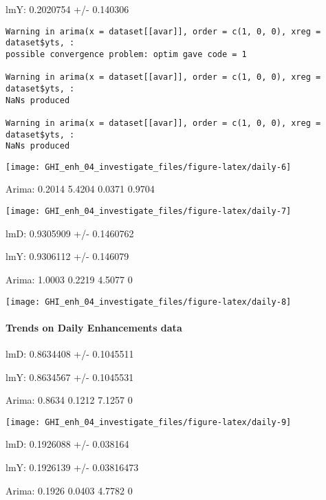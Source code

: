\documentclass[
  10pt,
  a4paper,oneside]{article}
\begin{document}
lmY: 0.2020754 +/- 0.140306

\begin{verbatim}
Warning in arima(x = dataset[[avar]], order = c(1, 0, 0), xreg = dataset$yts, :
possible convergence problem: optim gave code = 1

Warning in arima(x = dataset[[avar]], order = c(1, 0, 0), xreg = dataset$yts, :
NaNs produced

Warning in arima(x = dataset[[avar]], order = c(1, 0, 0), xreg = dataset$yts, :
NaNs produced
\end{verbatim}

\begin{center}\texttt{[image: GHI\_enh\_04\_investigate\_files/figure-latex/daily-6]} \end{center}

Arima: 0.2014 5.4204 0.0371 0.9704

\begin{center}\texttt{[image: GHI\_enh\_04\_investigate\_files/figure-latex/daily-7]} \end{center}

lmD: 0.9305909 +/- 0.1460762

lmY: 0.9306112 +/- 0.146079

Arima: 1.0003 0.2219 4.5077 0

\begin{center}\texttt{[image: GHI\_enh\_04\_investigate\_files/figure-latex/daily-8]} \end{center}

\newpage

\hypertarget{trends-on-daily-enhancements-data}{%
\paragraph{Trends on Daily Enhancements data}\label{trends-on-daily-enhancements-data}}

lmD: 0.8634408 +/- 0.1045511

lmY: 0.8634567 +/- 0.1045531

Arima: 0.8634 0.1212 7.1257 0

\begin{center}\texttt{[image: GHI\_enh\_04\_investigate\_files/figure-latex/daily-9]} \end{center}

lmD: 0.1926088 +/- 0.038164

lmY: 0.1926139 +/- 0.03816473

Arima: 0.1926 0.0403 4.7782 0
\end{document}
